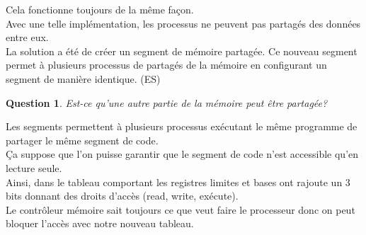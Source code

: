 \documentclass[12pt,a4paper]{report}
\newtheorem*{q}{Question}
\begin{document}
\begin{center}
\end{center}

Cela fonctionne toujours de la même façon.\\

Avec une telle implémentation, les processus ne peuvent pas partagés des données entre eux.\\
La solution a été de créer un segment de mémoire partagée. Ce nouveau segment permet à plusieurs processus de partagés de la mémoire en configurant un segment de manière identique. (ES)\\

\begin{q}Est-ce qu'une autre partie de la mémoire peut être partagée?\end{q}
Les segments permettent à plusieurs processus exécutant le même programme de partager le même segment de code.\\
Ça suppose que l'on puisse garantir que le segment de code n'est accessible qu'en lecture seule.\\
Ainsi, dans le tableau comportant les registres limites et bases ont rajoute un 3 bits donnant des droits d'accès (read, write, exécute).\\
Le contrôleur mémoire sait toujours ce que veut faire le processeur donc on peut bloquer l’accès avec notre nouveau tableau.\\
\end{document}
